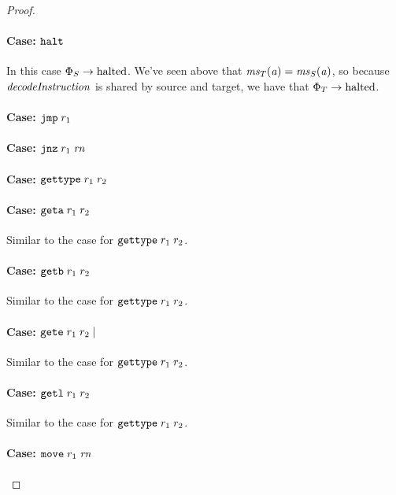 \documentclass[a4paper]{article}
\begin{document}
\begin{proof}
\paragraph{Case: $\protect\texttt{{\color{black} halt}}$}
In this case $\Phi_S \rightarrow \mathrm{halted}$.
We've seen above that $\mathit{ms}_T(\mathit{a}) = \mathit{ms}_S(\mathit{a})$, so because $\decInstr{}$ is shared by source and target, we have that $\Phi_T \rightarrow\mathrm{halted}$.

\paragraph{Case: $\protect\tjmp{\trg{r_1}}$}

\paragraph{Case: $\protect\tjnz{\trg{r_1}}{\trg{\rn}}$}

\paragraph{Case: $\protect\tisptr{\trg{r_1}}{\trg{r_2}}$}

\paragraph{Case: $\protect\tgeta{\trg{r_1}}{\trg{r_2}}$}
Similar to the case for $\tisptr{\trg{r_1}}{\trg{r_2}}$.

\paragraph{Case: $\protect\tgetb{\trg{r_1}}{\trg{r_2}}$}
Similar to the case for $\tisptr{\trg{r_1}}{\trg{r_2}}$.

\paragraph{Case: $\protect\tgete{\trg{r_1}}{\trg{r_2}}\mid$}
Similar to the case for $\tisptr{\trg{r_1}}{\trg{r_2}}$.

\paragraph{Case: $\protect\tgetlin{\trg{r_1}}{\trg{r_2}}$}
Similar to the case for $\tisptr{\trg{r_1}}{\trg{r_2}}$.

\paragraph{Case: $\protect\tmove{\trg{r_1}}{\trg{\rn}}$}


\end{proof}
\end{document}
